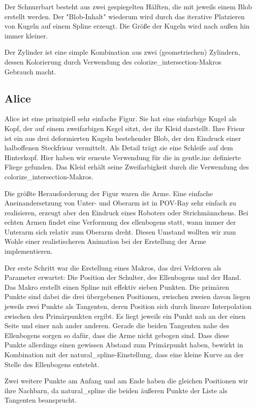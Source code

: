 \documentclass[twocolumn]{article}
\begin{document}
Der Schnurrbart besteht aus zwei gespiegelten Hälften, die mit jeweils einem Blob erstellt werden.
Der "Blob-Inhalt" wiederum wird durch das iterative Platzieren von Kugeln auf einem Spline erzeugt.
Die Größe der Kugeln wird nach außen hin immer kleiner.

Der Zylinder ist eine simple Kombination aus zwei (geometrischen) Zylindern, dessen Kolorierung durch Verwendung des colorize\_intersection-Makros Gebrauch macht.

\subsection{Alice}
Alice ist eine prinzipiell sehr einfache Figur. Sie hat eine einfarbige Kugel als Kopf, der auf einem zweifarbigen Kegel sitzt, der ihr Kleid darstellt.
Ihre Frisur ist ein aus drei deformierten Kugeln bestehender Blob, der den Eindruck einer halboffenen Steckfrisur vermittelt.
Als Detail trägt sie eine Schleife auf dem Hinterkopf. Hier haben wir erneute Verwendung für die in gentle.inc definierte Fliege gefunden.
Das Kleid erhält seine Zweifarbigkeit durch die Verwendung des colorize\_intersection-Makros.

Die größte Herausforderung der Figur waren die Arme.
Eine einfache Aneinandersetzung von Unter- und Oberarm ist in POV-Ray sehr einfach zu realisieren, erzeugt aber den Eindruck eines Roboters oder Strichmännchens.
Bei echten Armen findet eine Verformung des ellenbogens statt, wann immer der Unterarm sich relativ zum Oberarm dreht.
Diesen Umstand wollten wir zum Wohle einer realistischeren Animation bei der Erstellung der Arme implementieren.

Der erste Schritt war die Erstellung eines Makros, das drei Vektoren als Parameter erwartet: Die Position der Schulter, des Ellenbogens und der Hand.
Das Makro erstellt einen Spline mit effektiv sieben Punkten.
Die primären Punkte sind dabei die drei übergebenen Positionen, zwischen zweien davon liegen jeweils zwei Punkte als Tangenten, deren Position sich durch lineare Interpolation zwischen den Primärpunkten ergibt. Es liegt jeweils ein Punkt nah an der einen Seite und einer nah ander anderen.
Gerade die beiden Tangenten nahe des Ellenbogens sorgen so dafür, dass die Arme nicht gebogen sind. Dass diese Punkte allerdings einen gewissen Abstand zum Primärpunkt haben, bewirkt in Kombination mit der natural\_spline-Einstellung, dass eine kleine Kurve an der Stelle des Ellenbogens entsteht.

Zwei weitere Punkte am Anfang und am Ende haben die gleichen Positionen wir ihre Nachbarn, da natural\_spline die beiden äußeren Punkte der Liste als Tangenten beansprucht. %
\end{document}
